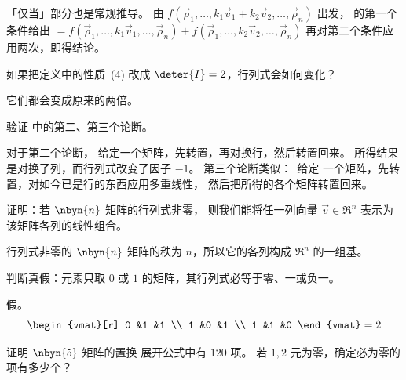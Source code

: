 \begin{exercises}
\begin{answer}
         「仅当」部分也是常规推导。
         由
         $
           f(\vec{\rho}_1,\dots,k_1\vec{v}_1+k_2\vec{v}_2,
             \dots,\vec{\rho}_n)
         $
         出发， 的第一个条件给出
         $
           =
           f(\vec{\rho}_1,\dots,k_1\vec{v}_1,\dots,\vec{\rho}_n)+
           f(\vec{\rho}_1,\dots,k_2\vec{v}_2,\dots,\vec{\rho}_n)
         $
         再对第二个条件应用两次，即得结论。
       \end{answer}
  \item
    如果把定义中的性质~(4) 改成 \( \deter{I}=2 \)，行列式会如何变化？
    \begin{answer}
       它们都会变成原来的两倍。
    \end{answer}
  \item
    验证  中的第二、第三个论断。
    \begin{answer}
      对于第二个论断，
      给定一个矩阵，先转置，再对换行，然后转置回来。
      所得结果是对换了列，而行列式改变了因子
      \( -1 \)。
      第三个论断类似：~给定
      一个矩阵，先转置，对如今已是行的东西应用多重线性，
      然后把所得的各个矩阵转置回来。
    \end{answer}
  \recommended \item
    证明：若 \( \nbyn{n} \) 矩阵的行列式非零，
    则我们能将任一列向量
    \( \vec{v}\in\Re^n \) 表示为该矩阵各列的线性组合。
    \begin{answer}
      行列式非零的 \( \nbyn{n} \) 矩阵的秩为
      \( n \)，所以它的各列构成 \( \Re^n \) 的一组基。
    \end{answer}
  \item
    \cite{Strang}
    判断真假：元素只取 $0$ 或 $1$ 的矩阵，其行列式必等于零、一或负一。
    \begin{answer}
      假。
      \begin{equation*}
        \begin{vmat}[r]
          0 &1  &1  \\
          1 &0  &1 \\
          1  &1 &0
        \end{vmat}
        =2
      \end{equation*}
     \end{answer}
  \item
    \begin{exparts}
      \partsitem 证明 \( \nbyn{5} \) 矩阵的置换
         展开公式中有 $120$ 项。
      \partsitem
         若 \( 1,2 \) 元为零，确定必为零的项有多少个？
    \end{exparts}

\end{exercises}
